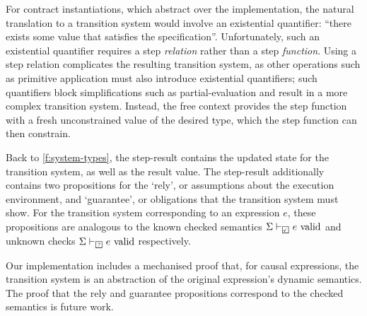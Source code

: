 \documentclass[a4paper,UKenglish,cleveref, autoref, thm-restate,anonymous]{lipics-v2021}
\begin{document}
For contract instantiations, which abstract over the implementation, the natural translation to a transition system would involve an existential quantifier: ``there exists some value that satisfies the specification''.
Unfortunately, such an existential quantifier requires a step \emph{relation} rather than a step \emph{function}.
Using a step relation complicates the resulting transition system, as other operations such as primitive application must also introduce existential quantifiers; such quantifiers block simplifications such as partial-evaluation and result in a more complex transition system.
Instead, the free context provides the step function with a fresh unconstrained value of the desired type, which the step function can then constrain.

Back to \autoref{f:system-types}, the step-result contains the updated state for the transition system, as well as the result value.
The step-result additionally contains two propositions for the `rely', or assumptions about the execution environment, and `guarantee', or obligations that the transition system must show.
For the transition system corresponding to an expression $e$, these propositions are analogous to the known checked semantics $\semcheck{\Sigma}{\PSValid}{e}$ and unknown checks $\semcheck{\Sigma}{\PSUnknown}{e}$ respectively.

Our implementation includes a mechanised proof that, for causal expressions, the transition system is an abstraction of the original expression's dynamic semantics.
The proof that the rely and guarantee propositions correspond to the checked semantics is future work.







\newcommand{\sysinit}[1]{\systrans{#1}_{\text{init}}}
\newcommand{\sysvalue}[1]{\systrans{#1}_{\text{value}}}
\newcommand{\sysupdate}[1]{\systrans{#1}_{\text{update}}}
\newcommand{\sysrely}[1]{\systrans{#1}_{\text{rely}}}
\newcommand{\sysguar}[1]{\systrans{#1}_{\text{guar}}}
\newcommand{\xctr}{\xcontractP{\PStatus}{e_r}{e_b}{\rawbind{x}{e_g}}}

\newcommand{\sysstate}[1]{\systrans{#1}_{\text{state}}}
\newcommand{\sysoracle}[1]{\systrans{#1}_{\text{free}}}
\end{document}
